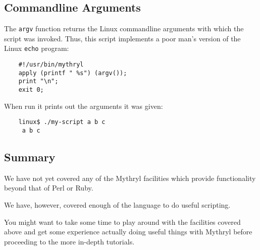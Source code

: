 \subsection{Commandline Arguments}

The {\tt argv} function returns the Linux commandline arguments with which the 
script was invoked.  Thus, this script implements a poor man's version of the 
Linux {\tt echo} program:

\begin{verbatim}
    #!/usr/bin/mythryl
    apply (printf " %s") (argv());
    print "\n";
    exit 0;
\end{verbatim}

When run it prints out the arguments it was given:

\begin{verbatim}
    linux$ ./my-script a b c
     a b c
\end{verbatim}

\cutend*


\subsection{Summary}

We have not yet covered any of the Mythryl facilities which provide functionality 
beyond that of Perl or Ruby.

We have, however, covered enough of the language to do useful scripting.

You might want to take some time to play around with the facilities 
covered above and get some experience actually doing useful things 
with Mythryl before proceeding to the more in-depth tutorials.

\cutend*